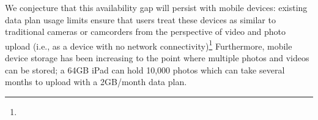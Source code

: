 %


We conjecture that this availability gap will persist with mobile
devices: %
existing data plan usage limits ensure that users treat these devices
as similar to traditional cameras or camcorders from the perspective
of video and photo upload (i.e., as a device with no network
connectivity)\footnote{}
%
Furthermore, mobile device storage has been increasing to the point
where multiple photos and videos can be stored; a 64GB iPad can hold
10,000 photos which can take several months to upload with a 2GB/month
data plan.



